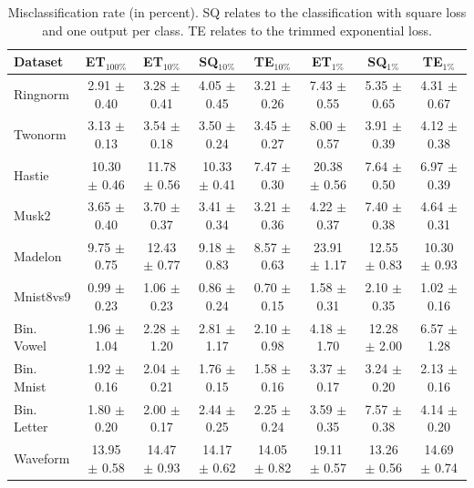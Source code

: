 \documentclass{article}
\newcommand{\bestA}{\cellcolor{orange}}
\newcommand{\bestB}{\cellcolor{dodgerblue}}
\begin{document}
\begin{table}[t]
\caption{Misclassification rate (in percent). SQ relates to the classification 
with square loss and one output per class. TE relates to the trimmed 
exponential loss.}
\label{tab:cls}
\vskip 0.15in
\begin{center}
\begin{small}
\begin{sc}
\begin{tabular}{l|c|ccc|ccc}
\hline
Dataset & ET$_{100\%}$ & ET$_{10\%}$ & SQ$_{10\%}$ & TE$_{10\%}$ & ET$_{1\%}$ & 
SQ$_{1\%}$ & TE$_{1\%}$\\
\hline 
Ringnorm & 2.91 $\pm$ 0.40 & 3.28 $\pm$ 0.41 & 4.05 $\pm$ 0.45 & \bestA 3.21 
$\pm$ 0.26 & 7.43 $\pm$ 0.55 & 5.35 $\pm$ 0.65 & \bestB 4.31 $\pm$ 0.67 \\
Twonorm & 3.13 $\pm$ 0.13 & 3.54 $\pm$ 0.18 & 3.50 $\pm$ 0.24 & \bestA 3.45 
$\pm$ 0.27 & 8.00 $\pm$ 0.57 & \bestB 3.91 $\pm$ 0.39 & 4.12 $\pm$ 0.38 \\
Hastie & 10.30 $\pm$ 0.46 & 11.78 $\pm$ 0.56 & 10.33 $\pm$ 0.41 & \bestA 7.47 
$\pm$ 0.30 & 20.38 $\pm$ 0.56 & 7.64 $\pm$ 0.50 & \bestB 6.97 $\pm$ 0.39 \\
Musk2 & 3.65 $\pm$ 0.40 & 3.70 $\pm$ 0.37 & 3.41 $\pm$ 0.34 & \bestA 3.21 $\pm$ 
0.36 & \bestB 4.22 $\pm$ 0.37 & 7.40 $\pm$ 0.38 & 4.64 $\pm$ 0.31 \\
Madelon & 9.75 $\pm$ 0.75 & 12.43 $\pm$ 0.77 & 9.18 $\pm$ 0.83 & \bestA 8.57 
$\pm$ 0.63 & 23.91 $\pm$ 1.17 & 12.55 $\pm$ 0.83 & \bestB 10.30 $\pm$ 0.93 \\
Mnist8vs9 & 0.99 $\pm$ 0.23 & 1.06 $\pm$ 0.23 & 0.86 $\pm$ 0.24 & \bestA 0.70 
$\pm$ 0.15 & 1.58 $\pm$ 0.31 & 2.10 $\pm$ 0.35 & \bestB 1.02 $\pm$ 0.16 \\
\hline
Bin. Vowel & 1.96 $\pm$ 1.04 & 2.28 $\pm$ 1.20 & 2.81 $\pm$ 1.17 & \bestA 2.10 
$\pm$ 0.98 & \bestB 4.18 $\pm$ 1.70 & 12.28 $\pm$ 2.00 & 6.57 $\pm$ 1.28 \\
Bin. Mnist & 1.92 $\pm$ 0.16 & 2.04 $\pm$ 0.21 & 1.76 $\pm$ 0.15 & \bestA 1.58 
$\pm$ 0.16 & 3.37 $\pm$ 0.17 & 3.24 $\pm$ 0.20 & \bestB 2.13 $\pm$ 0.16 \\
Bin. Letter & 1.80 $\pm$ 0.20 & \bestA 2.00 $\pm$ 0.17 & 2.44 $\pm$ 0.25 & 
2.25 $\pm$ 0.24 & \bestB 3.59 $\pm$ 0.35 & 7.57 $\pm$ 0.38 & 4.14 $\pm$ 0.20 \\
\hline
Waveform & 13.95 $\pm$ 0.58 & 14.47 $\pm$ 0.93 & 14.17 $\pm$ 0.62 & \bestA 
14.05 $\pm$ 0.82 & 19.11 $\pm$ 0.57 & \bestB 13.26 $\pm$ 0.56 & 14.69 $\pm$ 
0.74 \\

\end{tabular}
\end{sc}
\end{small}
\end{center}
\end{table}
\end{document}
